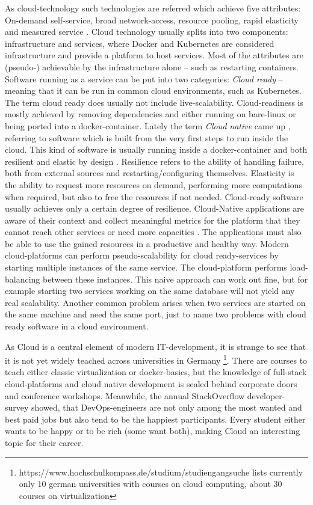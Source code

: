 \documentclass[english,utf8]{lni}
\begin{document}
As cloud-technology such technologies are referred which achieve five attributes: 
On-demand self-service, broad network-access, resource pooling, rapid elasticity and measured service \cite{ME11}. 
Cloud technology usually splits into two components:  infrastructure  and  services,  where  Docker and Kubernetes are considered infrastructure and provide a  platform  to  host  services.  
Most  of  the  attributes  are (pseudo-) achievable by the infrastructure alone – such as restarting containers. 
Software running as a service can be put into two categories: 
\textit{Cloud ready} – meaning that it can be run in common cloud environments, such as Kubernetes. 
The term cloud ready  does  usually  not  include  live-scalability. Cloud-readiness is mostly achieved by removing dependencies and either running on bare-linux or being ported into a docker-container. 
Lately the term \textit{Cloud native} came up \cite{BI17}, referring to software which is built from the very first steps to run inside the cloud. This kind of software is usually running inside a docker-container and both resilient and elastic by design \cite{TO17}.  
Resilience refers to the ability of handling failure, both from external sources and restarting/configuring themselves.  
Elasticity is the ability to request more resources on demand, performing more computations when required, but also to free the resources if not needed. 
Cloud-ready software usually achieves only a certain degree of resilience.   
Cloud-Native applications are aware of their context and collect meaningful metrics for the platform that they cannot reach other services or need more capacities \cite{MIN18}. 
The applications must also be able to use the gained resources in a productive and healthy way.  
Modern  cloud-platforms  can  perform  pseudo-scalability for cloud ready-services by starting multiple instances of the same service. 
The cloud-platform performs load-balancing between these instances. 
This naive approach can work out fine, but for example starting two services working on the same database will not yield any real scalability. 
Another common problem arises when two services are started on the same machine and need the same port, just to name two problems with cloud ready  software in a cloud environment. 

As Cloud is a central element of modern IT-development, it is strange to see that it is not yet widely teached across 
universities in Germany \footnote{https://www.hochschulkompass.de/studium/studiengangsuche lists currently only 10 german universities with courses on cloud computing, about 30 courses on virtualization }.
There are courses to teach either classic virtualization or docker-basics, but the knowledge of full-stack cloud-platforms and cloud native development is sealed behind corporate doors and conference workshops.
Meanwhile,  the  annual  StackOverflow  developer-survey \cite{SO19} showed, that DevOps-engineers are not only 
among the most wanted and best paid jobs but also tend to be the happiest participants.  
Every student either wants to be happy or to be rich (some want both), making Cloud an interesting topic for their career. 
\end{document}
